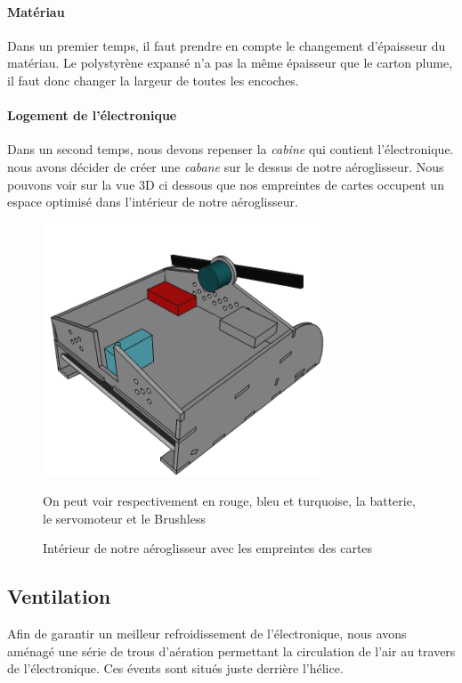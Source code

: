 \documentclass[a4paper,12pt]{book}
\begin{document}
				\paragraph{Matériau}Dans un premier temps, il faut prendre en compte le changement d'épaisseur du matériau. Le polystyrène expansé n'a pas la même épaisseur que le carton plume, il faut donc changer la largeur de toutes les encoches.
				\paragraph{Logement de l'électronique} Dans un second temps, nous devons repenser la \textit{cabine} qui contient l'électronique. nous avons décider de créer une \textit{cabane} sur le dessus de notre aéroglisseur. Nous pouvons voir sur la vue 3D ci dessous que nos empreintes de cartes occupent un espace optimisé dans l'intérieur de notre aéroglisseur.
				\begin{figure}[h]
					\begin{center}
						\includegraphics[width=0.75\textwidth]{../Illus/vueInterne.png}
					\end{center}
					\caption{Intérieur de notre aéroglisseur avec les empreintes des cartes}
					On peut voir respectivement en rouge, bleu et turquoise, la batterie, le servomoteur et le Brushless
					\label{MEPnous}
				\end{figure}
			\subsection{Ventilation}
			Afin de garantir un meilleur refroidissement de l'électronique, nous avons aménagé une série de trous d'aération permettant la circulation de l'air au travers de l'électronique. Ces évents sont situés juste derrière l'hélice.
\end{document}
